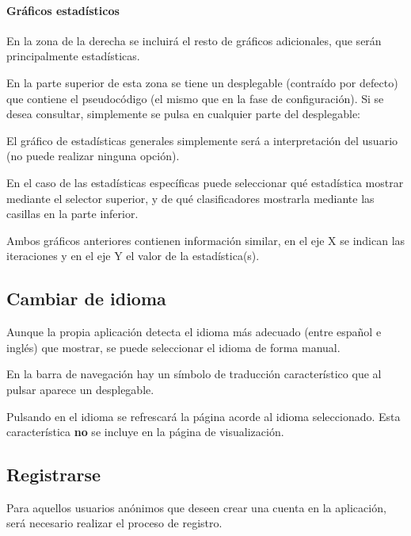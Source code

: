 \paragraph{Gráficos estadísticos} En la zona de la derecha se incluirá el resto
de gráficos adicionales, que serán principalmente estadísticas.


En la parte superior de esta zona se tiene un desplegable (contraído por
defecto) que contiene el pseudocódigo (el mismo que en la fase de
configuración). Si se desea consultar, simplemente se pulsa en cualquier parte
del desplegable:


El gráfico de estadísticas generales simplemente será a interpretación del
usuario (no puede realizar ninguna opción). 

En el caso de las estadísticas específicas puede seleccionar qué estadística
mostrar mediante el selector superior, y de qué clasificadores mostrarla
mediante las casillas en la parte inferior.

Ambos gráficos anteriores contienen información similar, en el eje X se indican
las iteraciones y en el eje Y el valor de la estadística(s).

\subsection{Cambiar de idioma}

Aunque la propia aplicación detecta el idioma más adecuado (entre español e
inglés) que mostrar, se puede seleccionar el idioma de forma manual.

En la barra de navegación hay un símbolo de traducción característico que al
pulsar aparece un desplegable.


Pulsando en el idioma se refrescará la página acorde al idioma seleccionado.
Esta característica \textbf{no} se incluye en la página de visualización.

\subsection{Registrarse}

Para aquellos usuarios anónimos que deseen crear una cuenta en la aplicación,
será necesario realizar el proceso de registro.

